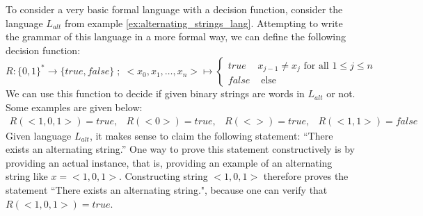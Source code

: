 \begin{example} To consider a very basic formal language with a decision function, consider the language $L_{alt}$ from example \ref{ex:alternating_strings_lang}. Attempting to write the grammar of this language in a more formal way, we can define the following decision function:
$$
R: \{0,1\}^* \to \{true,false\}\;;\; <x_0,x_1,\ldots,x_n> \mapsto 
\begin{cases}
true & x_{j-1} \neq x_{j} \text{ for all } 1\leq j \leq n \\
false & \text{ else}
\end{cases}
$$
We can use this function to decide if given binary strings are words in $L_{alt}$ or not. Some examples are given below:
$$
\begin{array}{cccc}
R(<1,0,1>)=true , & R(<0>)=true , & R(<>)=true , & R(<1,1>)=false
\end{array} 
$$
Given language $L_{alt}$, it makes sense to claim the following statement: ``There exists an alternating string.'' One way to prove this statement constructively is by providing an actual instance, that is, providing an example of an alternating string like $x = <1,0,1>$. Constructing string $<1,0,1>$ therefore proves the statement ``There exists an alternating string.", because one can verify that $R(<1,0,1>)=true$.
\end{example}
